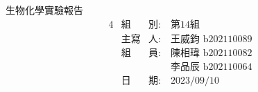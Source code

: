 


\pagestyle{empty}

\begin{center}
~\\
\vspace{2.7cm}
{\fontsize{36}{120}\selectfont 生物化學實驗報告}\\
\vspace{2.2cm}
{\fontsize{36}{80}\selectfont }
\vspace{2cm}
{\fontsize{18}{20}\selectfont 
  \begin{alignat*}{4}
    &\text{組}&\text{別}:\ &\text{第14組}\\
    &\text{主寫}&\text{人}:\ &\text{王威鈞 b202110089}\\
    &\text{組}&\text{員}:\ &\text{陳相瑋 b202110082}\\
         &&&\text{李品辰 b202110064}\\
    &\text{日}&\text{期}:\ &\text{2023/09/10}\\
  \end{alignat*}    
}


\end{center}
\newpage
